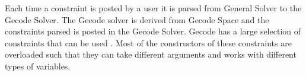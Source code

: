 Each time a constraint is posted by a user it is parsed from General Solver to the Gecode Solver. The Gecode solver is 
derived from Gecode Space  and the constraints parsed is posted in the 
Gecode Solver. Gecode has a large selection of constraints that can be used \cite[p. 58-80]{MPG:M}. Most of the 
constructors of these constraints are overloaded such that they can take different arguments and works with different 
types of variables. 